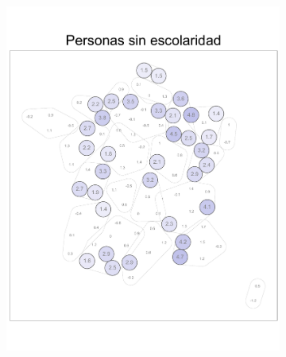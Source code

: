 \begin{figure}
\begin{subfigure}{0.275\textwidth}
	\includegraphics[width = \textwidth]{Figs/Efectos/Dorling_Efectos_Dip1_Modelo_H}
	\end{subfigure}
	~
	\begin{subfigure}{0.275\textwidth}

\end{subfigure}
\end{figure}

